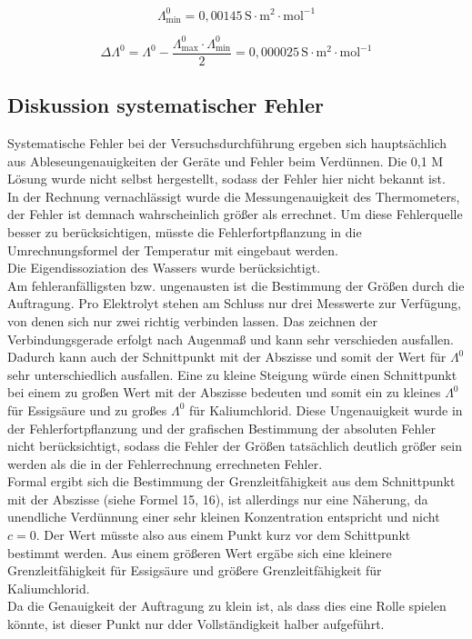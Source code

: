 \documentclass[12pt,a4paper,titlepage,headinclude,bibtotoc]{scrartcl}
\begin{document}
\begin{equation}
\Lambda^0_\mathrm{min} = 0,00145\, \mathrm{S \cdot m^{2} \cdot mol^{-1}} 
\end{equation}

\begin{equation}
\Delta \Lambda^0 = \Lambda^0 - \frac{\Lambda^0_\mathrm{max} \cdot \Lambda^0_\mathrm{min}}{2} = 0,000025 \, \mathrm{S \cdot m^{2} \cdot mol^{-1}} 
\end{equation}





\subsection{Diskussion systematischer Fehler}

Systematische Fehler bei der Versuchsdurchführung ergeben sich hauptsächlich aus Ableseungenauigkeiten der Geräte und Fehler beim Verdünnen. Die 0,1 M Lösung wurde nicht selbst hergestellt, sodass der Fehler hier nicht bekannt ist.\\

In der Rechnung vernachlässigt wurde die Messungenauigkeit des Thermometers, der Fehler ist demnach wahrscheinlich größer als errechnet. Um diese Fehlerquelle besser zu berücksichtigen, müsste die Fehlerfortpflanzung in die Umrechnungsformel der Temperatur mit eingebaut werden.\\

Die Eigendissoziation des Wassers wurde berücksichtigt.\\

Am fehleranfälligsten bzw. ungenausten ist die Bestimmung der Größen durch die Auftragung. Pro Elektrolyt stehen am Schluss nur drei Messwerte zur Verfügung, von denen sich nur zwei richtig verbinden lassen. Das zeichnen der Verbindungsgerade erfolgt nach Augenmaß und kann sehr verschieden ausfallen. Dadurch kann auch der Schnittpunkt mit der Abszisse und somit der Wert für $\Lambda^0$ sehr unterschiedlich ausfallen. Eine zu kleine Steigung würde einen Schnittpunkt bei einem zu großen Wert mit der Abszisse bedeuten und somit ein zu kleines $\Lambda^0$ für Essigsäure und zu großes $\Lambda^0$ für Kaliumchlorid. Diese Ungenauigkeit wurde in der Fehlerfortpflanzung und der grafischen Bestimmung der absoluten Fehler nicht berücksichtigt, sodass die Fehler der Größen tatsächlich deutlich größer sein werden als die in der Fehlerrechnung errechneten Fehler.\\
Formal ergibt sich die Bestimmung der Grenzleitfähigkeit aus dem Schnittpunkt mit der Abszisse (siehe Formel 15, 16), ist allerdings nur eine Näherung, da unendliche Verdünnung einer sehr kleinen Konzentration entspricht und nicht $c=0$. Der Wert müsste also aus einem Punkt kurz vor dem Schittpunkt bestimmt werden. Aus einem größeren Wert ergäbe sich eine kleinere Grenzleitfähigkeit für Essigsäure und größere Grenzleitfähigkeit für Kaliumchlorid.\\
Da die Genauigkeit der Auftragung zu klein ist, als dass dies eine Rolle spielen könnte, ist dieser Punkt nur dder Vollständigkeit halber aufgeführt.\\
\end{document}

